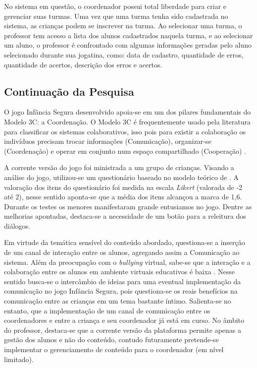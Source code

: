 \documentclass[12pt]{article}
\begin{document}
No sistema em questão, o coordenador possui total liberdade para criar e gerenciar suas turmas. Uma vez que uma turma tenha sido cadastrada no sistema, as crianças podem se inscrever na turma. Ao selecionar uma turma, o professor tem acesso a lista dos alunos cadastrados naquela turma, e ao selecionar um aluno, o professor é confrontado com algumas informações geradas pelo aluno selecionado durante sua jogatina, como: data de cadastro, quantidade de erros, quantidade de acertos, descrição dos erros e acertos.


\subsection{Continuação da Pesquisa}\label{secao:continuacao}

O jogo Infância Segura desenvolvido apoia-se em um dos pilares fundamentais do Modelo 3C: a Coordenação. O Modelo 3C é frequentemente usado pela literatura para classificar os sistemas colaborativos, isso pois para existir a colaboração os indivíduos precisam trocar informações (Comunicação), organizar-se (Coordenação) e operar em conjunto num espaço compartilhado (Cooperação) \cite{pimentel2006modelo}.

A corrente versão do jogo foi ministrada a um grupo de crianças. Visando a análise do jogo, utilizou-se um questionário baseado no modelo teórico de . A valoração dos itens do questionário foi medida na escala \textit{Likert} (valorada de -2 até 2), nesse sentido aponta-se que a média dos itens alcançou a marca de 1,6. Durante os testes os menores manifestaram grande entusiamos no jogo. Dentre as melhorias apontadas, destaca-se a necessidade de um botão para a releitura dos diálogos.

Em virtude da temática sensível do conteúdo abordado, questiona-se a inserção de um canal de interação entre os alunos, agregando assim a Comunicação ao sistema. Além da preocupação com o \textit{bullying} virtual, sabe-se que a interação e a colaboração entre os alunos em ambiente virtuais educativos é baixa \cite{aires2017estudo}. Nesse sentido busca-se o intercâmbio de ideias para uma eventual implementação da comunicação no jogo Infância Segura, pois questiona-se os reais benefícios na comunicação entre as crianças em um tema bastante íntimo. Salienta-se no entanto, que a implementação de um canal de comunicação entre os coordenadores e entre a criança e seu coordenador já está em curso. No âmbito do professor, destaca-se que a corrente versão da plataforma permite apenas a gestão dos alunos e não do conteúdo, contudo futuramente pretende-se implementar o gerenciamento de conteúdo para o coordenador (em nível limitado).
\end{document}
